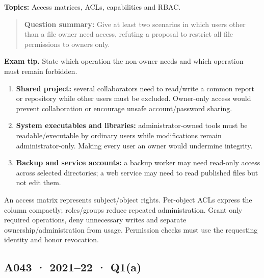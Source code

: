 \documentclass[11pt,a4paper]{article}
\begin{document}
\textbf{Topics:} Access matrices,\allowbreak{} ACLs,\allowbreak{} capabilities and RBAC.



\begin{quote}\small

\textbf{Question summary:} Give at least two scenarios in which users other than a file owner need access,\allowbreak{} refuting a proposal to restrict all file permissions to owners only.



\end{quote}


{\color{ForestGreen}\textbf{Exam tip.} State which operation the non-owner needs and which operation must remain forbidden.}



\begin{enumerate}

\item \textbf{Shared project:} several collaborators need to read/\allowbreak{}write a common report or repository while other users must be excluded. Owner-only access would prevent collaboration or encourage unsafe account/\allowbreak{}password sharing.

\item \textbf{System executables and libraries:} administrator-owned tools must be readable/\allowbreak{}executable by ordinary users while modifications remain administrator-only. Making every user an owner would undermine integrity.

\item \textbf{Backup and service accounts:} a backup worker may need read-only access across selected directories; a web service may need to read published files but not edit them.

\end{enumerate}

An access matrix represents subject/\allowbreak{}object rights. Per-object ACLs express the column compactly; roles/\allowbreak{}groups reduce repeated administration. Grant only required operations,\allowbreak{} deny unnecessary writes and separate ownership/\allowbreak{}administration from usage. Permission checks must use the requesting identity and honor revocation.




\clearpage
\subsection{A043 · 2021–22 · Q1(a)}\label{a043}
\end{document}
